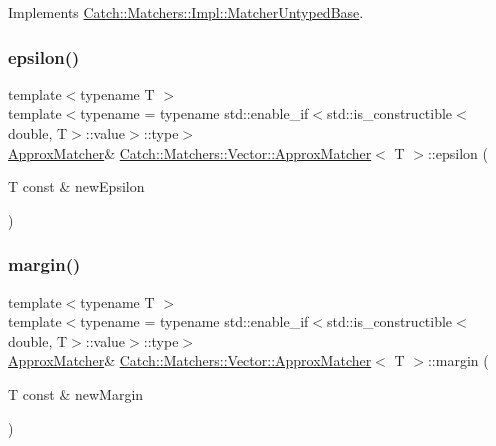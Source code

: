 Implements \mbox{\hyperlink{class_catch_1_1_matchers_1_1_impl_1_1_matcher_untyped_base_a91d3a907dbfcbb596077df24f6e11fe2}{Catch\+::\+Matchers\+::\+Impl\+::\+Matcher\+Untyped\+Base}}.

\mbox{\label{struct_catch_1_1_matchers_1_1_vector_1_1_approx_matcher_a319b3a7fa9d0f401bfda5b45dafbbf5a}} 
\subsubsection{\texorpdfstring{epsilon()}{epsilon()}}
{\footnotesize\ttfamily template$<$typename T $>$ \\
template$<$typename  = typename std\+::enable\+\_\+if$<$std\+::is\+\_\+constructible$<$double, T$>$\+::value$>$\+::type$>$ \\
\mbox{\hyperlink{struct_catch_1_1_matchers_1_1_vector_1_1_approx_matcher}{Approx\+Matcher}}\& \mbox{\hyperlink{struct_catch_1_1_matchers_1_1_vector_1_1_approx_matcher}{Catch\+::\+Matchers\+::\+Vector\+::\+Approx\+Matcher}}$<$ T $>$\+::epsilon (\begin{DoxyParamCaption}\item[{T const \&}]{new\+Epsilon }\end{DoxyParamCaption})\hspace{0.3cm}{\ttfamily [inline]}}

\mbox{\label{struct_catch_1_1_matchers_1_1_vector_1_1_approx_matcher_ac3b3afb3e5a9ad9ee0516e0202e08959}} 
\subsubsection{\texorpdfstring{margin()}{margin()}}
{\footnotesize\ttfamily template$<$typename T $>$ \\
template$<$typename  = typename std\+::enable\+\_\+if$<$std\+::is\+\_\+constructible$<$double, T$>$\+::value$>$\+::type$>$ \\
\mbox{\hyperlink{struct_catch_1_1_matchers_1_1_vector_1_1_approx_matcher}{Approx\+Matcher}}\& \mbox{\hyperlink{struct_catch_1_1_matchers_1_1_vector_1_1_approx_matcher}{Catch\+::\+Matchers\+::\+Vector\+::\+Approx\+Matcher}}$<$ T $>$\+::margin (\begin{DoxyParamCaption}\item[{T const \&}]{new\+Margin }\end{DoxyParamCaption})\hspace{0.3cm}{\ttfamily [inline]}}

